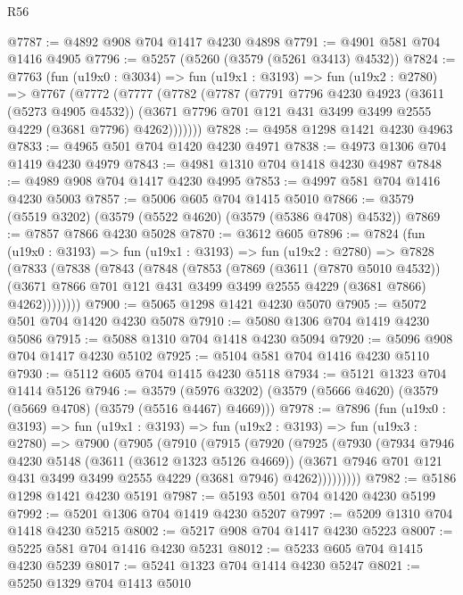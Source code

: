 \begin{lexlean}{R56}
\begin{coremodule}
@7787 := @4892 @908 @704 @1417 @4230 @4898
@7791 := @4901 @581 @704 @1416 @4905
@7796 := @5257 (@5260 (@3579 (@5261 @3413) @4532))
@7824 := @7763
    (fun (u19x0 : @3034) =>
    fun (u19x1 : @3193) =>
    fun (u19x2 : @2780) =>
    @7767
      (@7772
        (@7777
          (@7782
            (@7787
              (@7791
                @7796
                @4230
                @4923
                (@3611 (@5273 @4905 @4532))
                (@3671 @7796 @701 @121 @431 @3499 @3499 @2555 @4229 (@3681 @7796) @4262)))))))
@7828 := @4958 @1298 @1421 @4230 @4963
@7833 := @4965 @501 @704 @1420 @4230 @4971
@7838 := @4973 @1306 @704 @1419 @4230 @4979
@7843 := @4981 @1310 @704 @1418 @4230 @4987
@7848 := @4989 @908 @704 @1417 @4230 @4995
@7853 := @4997 @581 @704 @1416 @4230 @5003
@7857 := @5006 @605 @704 @1415 @5010
@7866 := @3579 (@5519 @3202) (@3579 (@5522 @4620) (@3579 (@5386 @4708) @4532))
@7869 := @7857 @7866 @4230 @5028
@7870 := @3612 @605
@7896 := @7824
    (fun (u19x0 : @3193) =>
    fun (u19x1 : @3193) =>
    fun (u19x2 : @2780) =>
    @7828
      (@7833
        (@7838
          (@7843
            (@7848
              (@7853
                (@7869
                  (@3611 (@7870 @5010 @4532))
                  (@3671 @7866 @701 @121 @431 @3499 @3499 @2555 @4229 (@3681 @7866) @4262))))))))
@7900 := @5065 @1298 @1421 @4230 @5070
@7905 := @5072 @501 @704 @1420 @4230 @5078
@7910 := @5080 @1306 @704 @1419 @4230 @5086
@7915 := @5088 @1310 @704 @1418 @4230 @5094
@7920 := @5096 @908 @704 @1417 @4230 @5102
@7925 := @5104 @581 @704 @1416 @4230 @5110
@7930 := @5112 @605 @704 @1415 @4230 @5118
@7934 := @5121 @1323 @704 @1414 @5126
@7946 := @3579 (@5976 @3202) (@3579 (@5666 @4620) (@3579 (@5669 @4708) (@3579 (@5516 @4467) @4669)))
@7978 := @7896
    (fun (u19x0 : @3193) =>
    fun (u19x1 : @3193) =>
    fun (u19x2 : @3193) =>
    fun (u19x3 : @2780) =>
    @7900
      (@7905
        (@7910
          (@7915
            (@7920
              (@7925
                (@7930
                  (@7934
                    @7946
                    @4230
                    @5148
                    (@3611 (@3612 @1323 @5126 @4669))
                    (@3671 @7946 @701 @121 @431 @3499 @3499 @2555 @4229 (@3681 @7946) @4262)))))))))
@7982 := @5186 @1298 @1421 @4230 @5191
@7987 := @5193 @501 @704 @1420 @4230 @5199
@7992 := @5201 @1306 @704 @1419 @4230 @5207
@7997 := @5209 @1310 @704 @1418 @4230 @5215
@8002 := @5217 @908 @704 @1417 @4230 @5223
@8007 := @5225 @581 @704 @1416 @4230 @5231
@8012 := @5233 @605 @704 @1415 @4230 @5239
@8017 := @5241 @1323 @704 @1414 @4230 @5247
@8021 := @5250 @1329 @704 @1413 @5010

\end{coremodule}
\end{lexlean}
